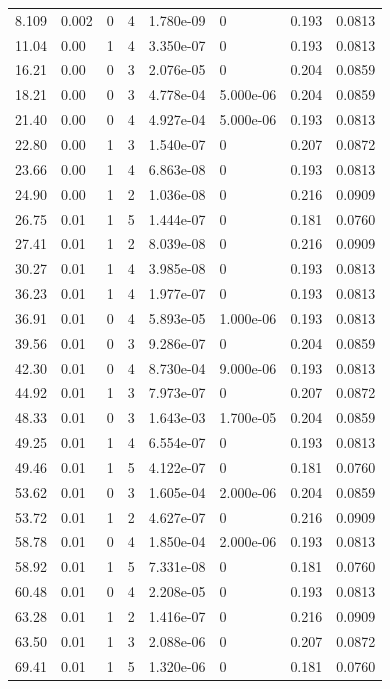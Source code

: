 \documentclass[preview]{standalone}
\begin{document}
{{\begin{tabular}{L{1.2cm}C{1.2cm} C{0.3cm}C{0.5cm} C{1.4cm}C{1.4cm} C{1.4cm}C{1.4cm}}
  8.109  &  0.002  & 0     &  4 &  1.780e-09  & 0  & 0.193 &  0.0813   \\ 
  11.04  &  0.00  & 1     &  4 &  3.350e-07  & 0  & 0.193 &  0.0813   \\ 
  16.21  &  0.00  & 0     &  3 &  2.076e-05  & 0  & 0.204 &  0.0859   \\ 
  18.21  &  0.00  & 0     &  3 &  4.778e-04  & 5.000e-06  & 0.204 &  0.0859   \\ 
  21.40  &  0.00  & 0     &  4 &  4.927e-04  & 5.000e-06  & 0.193 &  0.0813   \\ 
  22.80  &  0.00  & 1     &  3 &  1.540e-07  & 0  & 0.207 &  0.0872   \\ 
  23.66  &  0.00  & 1     &  4 &  6.863e-08  & 0  & 0.193 &  0.0813   \\ 
  24.90  &  0.00  & 1     &  2 &  1.036e-08  & 0  & 0.216 &  0.0909   \\ 
  26.75  &  0.01  & 1     &  5 &  1.444e-07  & 0  & 0.181 &  0.0760   \\ 
  27.41  &  0.01  & 1     &  2 &  8.039e-08  & 0  & 0.216 &  0.0909   \\ 
  30.27  &  0.01  & 1     &  4 &  3.985e-08  & 0  & 0.193 &  0.0813   \\ 
  36.23  &  0.01  & 1     &  4 &  1.977e-07  & 0  & 0.193 &  0.0813   \\ 
  36.91  &  0.01  & 0     &  4 &  5.893e-05  & 1.000e-06  & 0.193 &  0.0813   \\ 
  39.56  &  0.01  & 0     &  3 &  9.286e-07  & 0  & 0.204 &  0.0859   \\ 
  42.30  &  0.01  & 0     &  4 &  8.730e-04  & 9.000e-06  & 0.193 &  0.0813   \\ 
  44.92  &  0.01  & 1     &  3 &  7.973e-07  & 0  & 0.207 &  0.0872   \\ 
  48.33  &  0.01  & 0     &  3 &  1.643e-03  & 1.700e-05  & 0.204 &  0.0859   \\ 
  49.25  &  0.01  & 1     &  4 &  6.554e-07  & 0  & 0.193 &  0.0813   \\ 
  49.46  &  0.01  & 1     &  5 &  4.122e-07  & 0  & 0.181 &  0.0760   \\ 
  53.62  &  0.01  & 0     &  3 &  1.605e-04  & 2.000e-06  & 0.204 &  0.0859   \\ 
  53.72  &  0.01  & 1     &  2 &  4.627e-07  & 0  & 0.216 &  0.0909   \\ 
  58.78  &  0.01  & 0     &  4 &  1.850e-04  & 2.000e-06  & 0.193 &  0.0813   \\ 
  58.92  &  0.01  & 1     &  5 &  7.331e-08  & 0  & 0.181 &  0.0760   \\ 
  60.48  &  0.01  & 0     &  4 &  2.208e-05  & 0  & 0.193 &  0.0813   \\ 
  63.28  &  0.01  & 1     &  2 &  1.416e-07  & 0  & 0.216 &  0.0909   \\ 
  63.50  &  0.01  & 1     &  3 &  2.088e-06  & 0  & 0.207 &  0.0872   \\ 
  69.41  &  0.01  & 1     &  5 &  1.320e-06  & 0  & 0.181 &  0.0760   \\ 
\hline 
\end{tabular} 

}}
\end{document}
